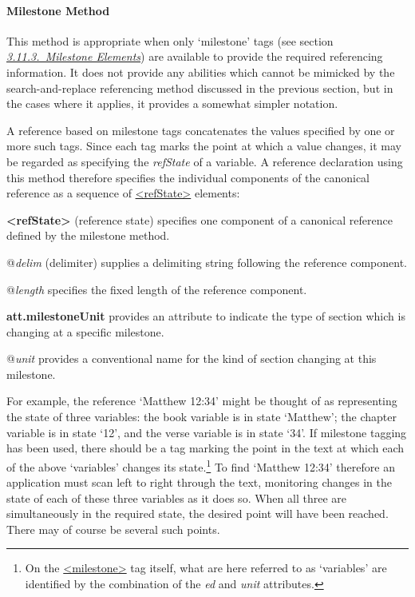 \paragraph[{Milestone Method}]{Milestone Method}\label{HD54M}\par
This method is appropriate when only ‘milestone’ tags (see section \textit{\hyperref[CORS5]{3.11.3.\ Milestone Elements}}) are available to provide the required referencing information. It does not provide any abilities which cannot be mimicked by the search-and-replace referencing method discussed in the previous section, but in the cases where it applies, it provides a somewhat simpler notation.\par
A reference based on milestone tags concatenates the values specified by one or more such tags. Since each tag marks the point at which a value changes, it may be regarded as specifying the \textit{refState} of a variable. A reference declaration using this method therefore specifies the individual components of the canonical reference as a sequence of \hyperref[TEI.refState]{<refState>} elements: 
\begin{sansreflist}
  
\item [\textbf{<refState>}] (reference state) specifies one component of a canonical reference defined by the milestone method.\hfil\\[-10pt]\begin{sansreflist}
    \item[@{\itshape delim}]
  (delimiter) supplies a delimiting string following the reference component.
    \item[@{\itshape length}]
  specifies the fixed length of the reference component.
\end{sansreflist}  
\item [\textbf{att.milestoneUnit}] provides an attribute to indicate the type of section which is changing at a specific milestone.\hfil\\[-10pt]\begin{sansreflist}
    \item[@{\itshape unit}]
  provides a conventional name for the kind of section changing at this milestone.
\end{sansreflist}  
\end{sansreflist}
\par
For example, the reference ‘Matthew 12:34’ might be thought of as representing the state of three variables: the \textsf{book} variable is in state ‘Matthew’; the \textsf{chapter} variable is in state ‘12’, and the \textsf{verse} variable is in state ‘34’. If milestone tagging has been used, there should be a tag marking the point in the text at which each of the above ‘variables’ changes its state.\footnote{On the \hyperref[TEI.milestone]{<milestone>} tag itself, what are here referred to as ‘variables’ are identified by the combination of the {\itshape ed} and {\itshape unit} attributes.} To find ‘Matthew 12:34’ therefore an application must scan left to right through the text, monitoring changes in the state of each of these three variables as it does so. When all three are simultaneously in the required state, the desired point will have been reached. There may of course be several such points.\par
